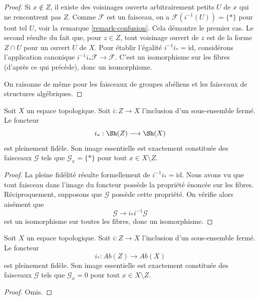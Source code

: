 \begin{proof}
Si $x \not \in Z$, il existe des voisinages ouverts arbitrairement petits
$U$ de $x$ qui ne rencontrent pas $Z$.
Comme $\mathcal{F}$ est un faisceau, on a
$\mathcal{F}(i^{-1}(U)) = \{*\}$ pour tout tel $U$,
voir la remarque \ref{remark-confusion}. Cela démontre le premier cas.
Le second résulte du fait que, pour $z \in Z$, tout voisinage ouvert
de $z$ est de la forme $Z \cap U$ pour un ouvert $U$ de $X$.
Pour établir l'égalité $i^{-1}i_* = \text{id}$, considérons l'application
canonique $i^{-1}i_*\mathcal{F} \to \mathcal{F}$. C'est un isomorphisme
sur les fibres (d'après ce qui précède), donc un isomorphisme.

\medskip\noindent
On raisonne de même pour les faisceaux de groupes abéliens et les
faisceaux de structures algébriques.
\end{proof}


\begin{lemma}
\label{lemma-equivalence-categories-closed}
Soit $X$ un espace topologique.
Soit $i : Z \to X$ l'inclusion d'un sous-ensemble fermé.
Le foncteur
$$
i_* : \Sh(Z) \longrightarrow \Sh(X)
$$
est pleinement fidèle. Son image essentielle est exactement constituée
des faisceaux $\mathcal{G}$ tels que
$\mathcal{G}_x = \{*\}$ pour tout $x \in X \setminus Z$.
\end{lemma}

\begin{proof}
La pleine fidélité résulte formellement de $i^{-1} i_* = \text{id}$.
Nous avons vu que tout faisceau dans l'image du foncteur possède
la propriété énoncée sur les fibres. Réciproquement, supposons
que $\mathcal{G}$ possède cette propriété.
On vérifie alors aisément que
$$
\mathcal{G} \to i_* i^{-1} \mathcal{G}
$$
est un isomorphisme sur toutes les fibres, donc un isomorphisme.
\end{proof}

\begin{lemma}
\label{lemma-equivalence-categories-closed-abelian}
Soit $X$ un espace topologique.
Soit $i : Z \to X$ l'inclusion d'un sous-ensemble fermé.
Le foncteur
$$
i_* : \textit{Ab}(Z) \longrightarrow \textit{Ab}(X)
$$
est pleinement fidèle. Son image essentielle est exactement constituée
des faisceaux $\mathcal{G}$ tels que
$\mathcal{G}_x = 0$ pour tout $x \in X \setminus Z$.
\end{lemma}

\begin{proof}
Omis.
\end{proof}

